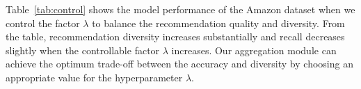 Table~\ref{tab:control} shows the model performance of the Amazon dataset when we control the factor $\lambda$ to balance the recommendation quality and diversity. From the table, recommendation diversity increases substantially and recall decreases slightly when the controllable factor $\lambda$ increases. Our aggregation module can achieve the optimum trade-off between the accuracy and diversity by choosing an appropriate value for the hyperparameter $\lambda$.






